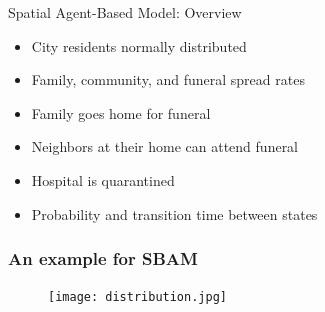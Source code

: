 \documentclass[30pt]{beamer}
\begin{document}
%
%
%      
%       
%        

\begin{frame}{Spatial Agent-Based Model: Overview}
\begin{itemize}
\item City residents normally distributed
\item Family, community, and funeral spread rates
\item Family goes home for funeral
\item Neighbors at their home can attend funeral
\item Hospital is quarantined
\item Probability and transition time between states
\end{itemize}
\end{frame}

\begin{frame}
\frametitle{An example for SBAM}
\begin{figure}
\texttt{[image: distribution.jpg]}
\end{figure}
\end{frame}
\end{document}
